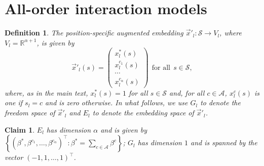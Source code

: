 \documentclass{article}
\numberwithin{myclaim}{section}
\newcommand{\set}[1]{\left\{ #1 \right\}}
\newtheorem{claim}{Claim}
\newtheorem{definition}{Definition}
\begin{document}
\section{All-order interaction models}

\begin{definition} 
The position-specific augmented embedding $\vec{x}'_l:\mathcal{S} \to V_l$, where $V_l = \mathbb{R}^{\alpha+1}$, is given by
\begin{equation}
    \vec{x}'_l(s) = \left( \begin{array}{c} x^*_l(s) \\ x^{c_1}_l(s) \\ \cdots \\ x^{c_\alpha}_l(s) \end{array} \right)~~\textrm{for all}~~s \in \mathcal{S},
\end{equation} 
where, as in the main text, $x^*_l(s) = 1$ for all $s \in \mathcal{S}$ and, for all $c \in \mathcal{A}$, $x^c_l(s)$ is one if $s_l = c$ and is zero otherwise. In what follows, we use $G_l$ to denote the freedom space of $\vec{x}'_l$ and $E_l$ to denote the embedding space of $\vec{x}'_l$. 
\end{definition}

\begin{claim} \label{claim:E_l_and_G_l}
$E_l$ has dimension $\alpha$ and is given by $\set{(\beta^*, \beta^{c_1}, \ldots, \beta^{c_\alpha})^\top: \beta^* = \sum_{c \in \mathcal{A}} \beta^c }$; $G_l$ has dimension $1$ and is spanned by the vector $(-1, 1, \ldots, 1)^\top$.  
\end{claim}
\end{document}
